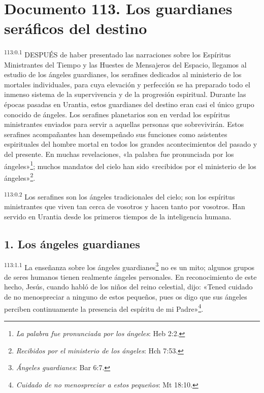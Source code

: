 \chapter{Documento 113. Los guardianes seráficos del destino}
\par
\textsuperscript{113:0.1} DESPUÉS de haber presentado las narraciones sobre los Espíritus Ministrantes del Tiempo y las Huestes de Mensajeros del Espacio, llegamos al estudio de los ángeles guardianes, los serafines dedicados al ministerio de los mortales individuales, para cuya elevación y perfección se ha preparado todo el inmenso sistema de la supervivencia y de la progresión espiritual. Durante las épocas pasadas en Urantia, estos guardianes del destino eran casi el único grupo conocido de ángeles. Los serafines planetarios son en verdad los espíritus ministrantes enviados para servir a aquellas personas que sobrevivirán. Estos serafines acompañantes han desempeñado sus funciones como asistentes espirituales del hombre mortal en todos los grandes acontecimientos del pasado y del presente. En muchas revelaciones, «la palabra fue pronunciada por los ángeles»\footnote{\textit{La palabra fue pronunciada por los ángeles}: Heb 2:2.}; muchos mandatos del cielo han sido «recibidos por el ministerio de los ángeles»\footnote{\textit{Recibidos por el ministerio de los ángeles}: Hch 7:53.}.

\par
\textsuperscript{113:0.2} Los serafines son los ángeles tradicionales del cielo; son los espíritus ministrantes que viven tan cerca de vosotros y hacen tanto por vosotros. Han servido en Urantia desde los primeros tiempos de la inteligencia humana.

\section*{1. Los ángeles guardianes}
\par
\textsuperscript{113:1.1} La enseñanza sobre los ángeles guardianes\footnote{\textit{Ángeles guardianes}: Bar 6:7.} no es un mito; algunos grupos de seres humanos tienen realmente ángeles personales. En reconocimiento de este hecho, Jesús, cuando habló de los niños del reino celestial, dijo: «Tened cuidado de no menospreciar a ninguno de estos pequeños, pues os digo que sus ángeles perciben continuamente la presencia del espíritu de mi Padre»\footnote{\textit{Cuidado de no menospreciar a estos pequeños}: Mt 18:10.}.

